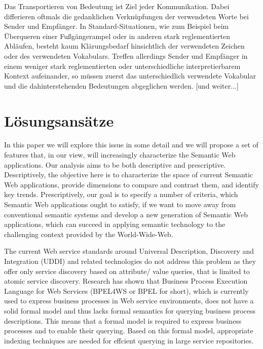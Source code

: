 \documentclass[10pt,a4paper]{article}
\begin{document}

Das Transportieren von Bedeutung ist Ziel jeder Kommunikation. Dabei
differieren oftmals die gedanklichen Verknüpfungen der verwendeten Worte bei
Sender und Empfänger. In Standard-Situationen, wie zum Beispiel beim
Überqueren einer Fußgängerampel oder in anderen stark reglementierten
Abläufen, besteht kaum Klärungsbedarf hinsichtlich der verwendeten Zeichen
oder des verwendeten Vokabulars. Treffen allerdings Sender und Empfänger in
einem weniger stark reglementierten oder unterschiedliche interpretierbarem
Kontext aufeinander, so müssen zuerst das unterschiedlich verwendete Vokabular
und die dahinterstehenden Bedeutungen abgeglichen werden. [und weiter...] \cite{sgthesis}

\section{Lösungsansätze}
\label{l:loesungen}

In this paper we will explore this issue in some detail and we will propose a set of
features that, in our view, will increasingly characterize the Semantic Web
applications. Our analysis aims to be both descriptive and prescriptive. Descriptively,
the objective here is to characterize the space of current Semantic Web applications,
provide dimensions to compare and contrast them, and identify key trends.
Prescriptively, our goal is to specify a number of criteria, which Semantic Web
applications ought to satisfy, if we want to move away from conventional semantic
systems and develop a new generation of Semantic Web applications, which can
succeed in applying semantic technology to the challenging context provided by the
World-Wide-Web. \cite{ngswa}

The current Web service standards around Universal
Description, Discovery and Integration (UDDI) and related technologies do not address this
problem as they offer only service discovery based on attribute/ value queries, that is limited
to atomic service discovery. Research has shown that Business Process Execution Language
for Web Services (BPEL4WS or BPEL for short), which is currently used to express business
processes in Web service environments, does not have a solid formal model and thus lacks
formal semantics for querying business process descriptions. This means that a formal model is
required to express business processes and to enable their querying. Based on this formal model,
appropriate indexing techniques are needed for effcient querying in large service repositories. \cite{mothesis}
\end{document}
